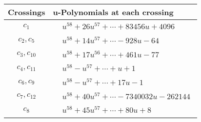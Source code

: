 \documentclass[1p]{elsarticle_modified}
\theoremstyle{definition}
\begin{document}
\begin{tabular}{m{50pt}|m{274pt}}
Crossings & \hspace{64pt}u-Polynomials at each crossing \\
\hline $$\begin{aligned}c_{1}\end{aligned}$$&$\begin{aligned}
&u^{58}+26 u^{57}+\cdots+83456 u+4096
\end{aligned}$\\
\hline $$\begin{aligned}c_{2},c_{5}\end{aligned}$$&$\begin{aligned}
&u^{58}+14 u^{57}+\cdots-928 u-64
\end{aligned}$\\
\hline $$\begin{aligned}c_{3},c_{10}\end{aligned}$$&$\begin{aligned}
&u^{58}+17 u^{56}+\cdots+461 u-77
\end{aligned}$\\
\hline $$\begin{aligned}c_{4},c_{11}\end{aligned}$$&$\begin{aligned}
&u^{58}- u^{57}+\cdots+u+1
\end{aligned}$\\
\hline $$\begin{aligned}c_{6},c_{9}\end{aligned}$$&$\begin{aligned}
&u^{58}- u^{57}+\cdots+17 u-1
\end{aligned}$\\
\hline $$\begin{aligned}c_{7},c_{12}\end{aligned}$$&$\begin{aligned}
&u^{58}+40 u^{57}+\cdots-7340032 u-262144
\end{aligned}$\\
\hline $$\begin{aligned}c_{8}\end{aligned}$$&$\begin{aligned}
&u^{58}+45 u^{57}+\cdots+80 u+8
\end{aligned}$\\
\hline
\end{tabular}\\~\\
\newpage\renewcommand{\arraystretch}{1}
\end{document}
